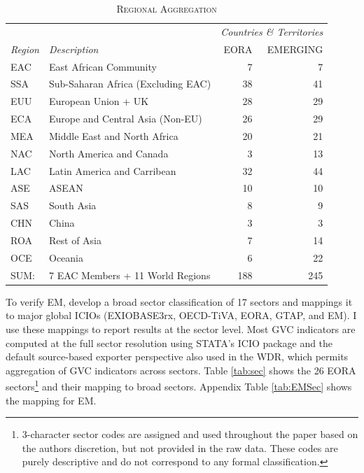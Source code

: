 \documentclass[a4paper]{article}
\begin{document}
\begin{table}[h!]
\centering
\caption{\label{tab:ctry}\textsc{Regional Aggregation}}
\vspace{2mm}
\begin{tabular}{llrr} \toprule
& & \multicolumn{2}{c}{\textit{Countries \& Territories}} \\
\textit{Region} & \textit{Description} & EORA & EMERGING \\ \midrule
EAC & East African Community & 7 & 7 \\
SSA & Sub-Saharan Africa (Excluding EAC) & 38 & 41 \\
EUU & European Union + UK & 28 & 29 \\
ECA & Europe and Central Asia (Non-EU) & 26 & 29 \\
MEA & Middle East and North Africa & 20 & 21\\
NAC & North America and Canada & 3 & 13 \\
LAC & Latin America and Carribean & 32 & 44 \\
ASE & ASEAN & 10 & 10 \\
SAS & South Asia & 8 & 9 \\
CHN & China & 3 & 3 \\
ROA & Rest of Asia & 7 & 14 \\
OCE & Oceania & 6 & 22 \\ \midrule
SUM: & 7 EAC Members + 11 World Regions & 188 & 245
 \\ \bottomrule
\end{tabular}
\end{table}
\FloatBarrier


To verify EM, \citep{huo2022full} develop a broad sector classification of 17 sectors and mappings it to major global ICIOs (EXIOBASE3rx, OECD-TiVA, EORA, GTAP, and EM). I use these mappings to report results at the sector level. Most GVC indicators are computed at the full sector resolution using STATA's ICIO package \citep{belotti2020icio} and the default source-based exporter perspective \citep{borin2019measuring} also used in the WDR, which permits aggregation of GVC indicators across sectors. Table \ref{tab:sec} shows the 26 EORA sectors\footnote{3-character sector codes are assigned and used throughout the paper based on the authors discretion, but not provided in the raw data. These codes are purely descriptive and do not correspond to any formal classification.} and their mapping to broad sectors. Appendix Table \ref{tab:EMSec} shows the mapping for EM. 
 
\end{document}
